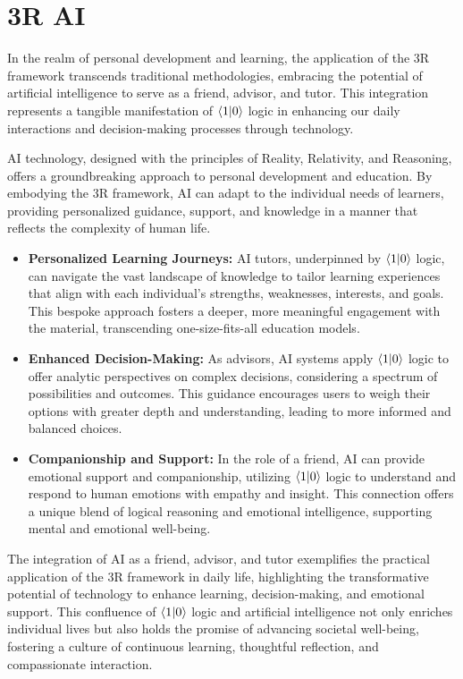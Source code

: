 \documentclass[12pt]{article}
\begin{document}
\section*{3R AI}

In the realm of personal development and learning, the application of the 3R framework transcends traditional methodologies, embracing the potential of artificial intelligence to serve as a friend, advisor, and tutor. This integration represents a tangible manifestation of \(\langle 1 | 0 \rangle\) logic in enhancing our daily interactions and decision-making processes through technology.

AI technology, designed with the principles of Reality, Relativity, and Reasoning, offers a groundbreaking approach to personal development and education. By embodying the 3R framework, AI can adapt to the individual needs of learners, providing personalized guidance, support, and knowledge in a manner that reflects the complexity of human life.

\begin{itemize}
    \item \textbf{Personalized Learning Journeys:} AI tutors, underpinned by \(\langle 1 | 0 \rangle\) logic, can navigate the vast landscape of knowledge to tailor learning experiences that align with each individual's strengths, weaknesses, interests, and goals. This bespoke approach fosters a deeper, more meaningful engagement with the material, transcending one-size-fits-all education models.
    \item \textbf{Enhanced Decision-Making:} As advisors, AI systems apply \(\langle 1 | 0 \rangle\) logic to offer analytic perspectives on complex decisions, considering a spectrum of possibilities and outcomes. This guidance encourages users to weigh their options with greater depth and understanding, leading to more informed and balanced choices.
    \item \textbf{Companionship and Support:} In the role of a friend, AI can provide emotional support and companionship, utilizing \(\langle 1 | 0 \rangle\) logic to understand and respond to human emotions with empathy and insight. This connection offers a unique blend of logical reasoning and emotional intelligence, supporting mental and emotional well-being.
\end{itemize}

The integration of AI as a friend, advisor, and tutor exemplifies the practical application of the 3R framework in daily life, highlighting the transformative potential of technology to enhance learning, decision-making, and emotional support. This confluence of \(\langle 1 | 0 \rangle\) logic and artificial intelligence not only enriches individual lives but also holds the promise of advancing societal well-being, fostering a culture of continuous learning, thoughtful reflection, and compassionate interaction.
\end{document}
